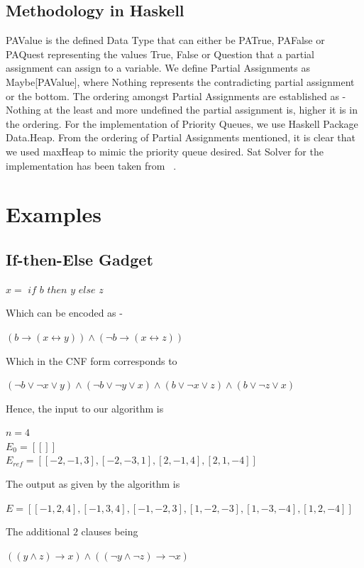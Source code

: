 \documentclass{article}
\theoremstyle{plain}
\begin{document}
\subsection{Methodology in Haskell}
PAValue is the defined Data Type that can either be PATrue, PAFalse or PAQuest representing the values True, False or Question that a partial assignment can assign to a variable. We define Partial Assignments as Maybe[PAValue], where Nothing represents the contradicting partial assignment or the bottom. The ordering amongst Partial Assignments are established as - Nothing at the least and more undefined the partial assignment is, higher it is in the ordering. For the implementation of Priority Queues, we use Haskell Package Data.Heap. From the ordering of Partial Assignments mentioned, it is clear that we used maxHeap to mimic the priority queue desired. Sat Solver for the implementation has been taken from ~\cite{sat.hs}.

\section{Examples}
\subsection{If-then-Else Gadget}
\begin{center}
$x = $ $if$ $b$ $then$ $y$ $else$ $z$
\end{center}
Which can be encoded as -
\begin{center}
$ (b \longrightarrow (x \longleftrightarrow y))  \wedge (\neg b \longrightarrow (x \longleftrightarrow z))$  
\end{center}
Which in the CNF form corresponds to
\begin{center}
$(\neg b \vee \neg x \vee y) \wedge (\neg b \vee \neg y \vee x) \wedge (b \vee \neg x \vee z) \wedge (b \vee \neg z \vee x)$
\end{center}
Hence, the input to our algorithm is
\begin{center}
$n = 4$\\
$E_0 = [[]]$ \\
$E_{ref} = [[-2,-1,3],[-2,-3,1],[2,-1,4],[2,1,-4]]$
\end{center}
The output as given by the algorithm is 
\begin{center}
$E = [[-1,2,4],[-1,3,4],[-1,-2,3],[1,-2,-3],[1,-3,-4],[1,2,-4]]$
\end{center}
The additional $2$ clauses being 
\begin{center}
$((y \wedge z) \longrightarrow x) \wedge ((\neg y \wedge \neg z) \longrightarrow \neg x)$
\end{center}
\end{document}
